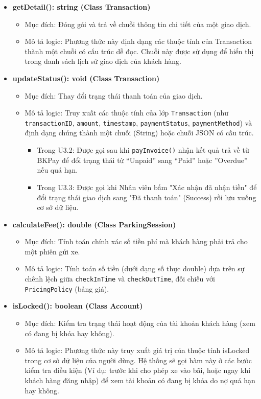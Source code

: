 \begin{itemize}
    \item \textbf{getDetail(): string (Class Transaction)}
    \begin{itemize}
        \item Mục đích: Đóng gói và trả về chuỗi thông tin chi tiết của một giao dịch.
        \item Mô tả logic: Phương thức này định dạng các thuộc tính của Transaction thành một chuỗi có cấu trúc dễ đọc. Chuỗi này được sử dụng để hiển thị trong danh sách lịch sử giao dịch của khách hàng.
    \end{itemize}

    \item \textbf{updateStatus(): void (Class Transaction)}
    \begin{itemize}
        \item Mục đích: Thay đổi trạng thái thanh toán của giao dịch.

        \item Mô tả logic: Truy xuất các thuộc tính của lớp \texttt{Transaction} (như \texttt{transactionID}, \texttt{amount}, \texttt{timestamp}, \texttt{paymentStatus}, \texttt{paymentMethod}) và định dạng chúng thành một chuỗi (String) hoặc chuỗi JSON có cấu trúc.
        \begin{itemize}
            \item Trong U3.2: Được gọi sau khi \texttt{payInvoice()} nhận kết quả trả về từ BKPay để đổi trạng thái từ ``Unpaid'' sang ``Paid'' hoặc ''Overdue'' nếu quá hạn.
            \item Trong U3.3: Được gọi khi Nhân viên bấm "Xác nhận đã nhận tiền" để đổi trạng thái giao dịch sang "Đã thanh toán" (Success) rồi lưu xuống cơ sở dữ liệu.
        \end{itemize}
    \end{itemize}
    
    \item \textbf{calculateFee(): double (Class ParkingSession)}
    \begin{itemize}
        \item Mục đích: Tính toán chính xác số tiền phí mà khách hàng phải trả cho một phiên gửi xe.
        \item Mô tả logic: Tính toán số tiền (dưới dạng số thực double) dựa trên sự chênh lệch giữa \texttt{checkInTime} và \texttt{checkOutTime}, đối chiếu với \texttt{PricingPolicy} (bảng giá).
    \end{itemize}

    \item \textbf{isLocked(): boolean (Class Account)}
    \begin{itemize}
        \item Mục đích: Kiểm tra trạng thái hoạt động của tài khoản khách hàng (xem có đang bị khóa hay không).
        \item Mô tả logic: Phương thức này truy xuất giá trị của thuộc tính isLocked trong cơ sở dữ liệu của người dùng. Hệ thống sẽ gọi hàm này ở các bước kiểm tra điều kiện (Ví dụ: trước khi cho phép xe vào bãi, hoặc ngay khi khách hàng đăng nhập) để xem tài khoản có đang bị khóa do nợ quá hạn hay không.
    \end{itemize}
\end{itemize}

